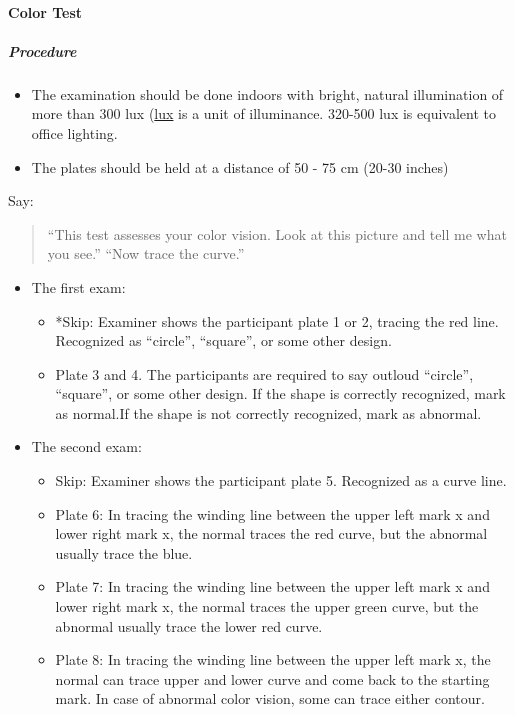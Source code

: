 \documentclass[]{article}
\providecommand{\tightlist}{%
  \setlength{\itemsep}{0pt}\setlength{\parskip}{0pt}}
\let\oldparagraph\paragraph
\renewcommand{\paragraph}[1]{\oldparagraph{#1}\mbox{}}
\let\oldsubparagraph\subparagraph
\renewcommand{\subparagraph}[1]{\oldsubparagraph{#1}\mbox{}}
\begin{document}
\hypertarget{color-test}{%
\paragraph{Color Test}\label{color-test}}

\hypertarget{procedure-1}{%
\subparagraph{Procedure}\label{procedure-1}}

\begin{itemize}
\tightlist
\item
  The examination should be done indoors with bright, natural
  illumination of more than 300 lux
  (\href{https://en.wikipedia.org/wiki/Lux}{lux} is a unit of
  illuminance. 320-500 lux is equivalent to office lighting.
\item
  The plates should be held at a distance of 50 - 75 cm (20-30 inches)
\end{itemize}

Say:

\begin{quote}
``This test assesses your color vision. Look at this picture and tell me
what you see.'' ``Now trace the curve.''
\end{quote}

\begin{itemize}
\tightlist
\item
  The first exam:

  \begin{itemize}
  \tightlist
  \item
    *Skip: Examiner shows the participant plate 1 or 2, tracing the red
    line. Recognized as ``circle'', ``square'', or some other design.
  \item
    Plate 3 and 4. The participants are required to say outloud
    ``circle'', ``square'', or some other design. If the shape is
    correctly recognized, mark as normal.If the shape is not correctly
    recognized, mark as abnormal.
  \end{itemize}
\item
  The second exam:

  \begin{itemize}
  \tightlist
  \item
    Skip: Examiner shows the participant plate 5. Recognized as a curve
    line.
  \item
    Plate 6: In tracing the winding line between the upper left mark x
    and lower right mark x, the normal traces the red curve, but the
    abnormal usually trace the blue.
  \item
    Plate 7: In tracing the winding line between the upper left mark x
    and lower right mark x, the normal traces the upper green curve, but
    the abnormal usually trace the lower red curve.
  \item
    Plate 8: In tracing the winding line between the upper left mark x,
    the normal can trace upper and lower curve and come back to the
    starting mark. In case of abnormal color vision, some can trace
    either contour.
  \end{itemize}
\end{itemize}
\end{document}
